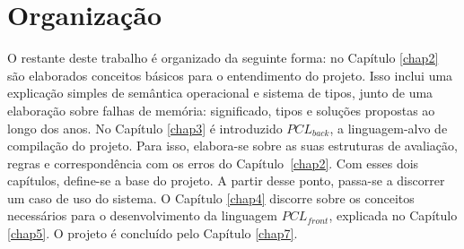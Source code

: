 \section{Organização}

O restante deste trabalho é organizado da seguinte forma: no Capítulo \ref{chap2} são elaborados conceitos básicos para o entendimento do projeto. Isso inclui uma explicação simples de semântica operacional e sistema de tipos, junto de uma elaboração sobre falhas de memória: significado, tipos e soluções propostas ao longo dos anos. No Capítulo \ref{chap3} é introduzido $PCL_{back}$, a linguagem-alvo de compilação do projeto. Para isso, elabora-se sobre as suas estruturas de avaliação, regras e correspondência com os erros do Capítulo~\ref{chap2}. Com esses dois capítulos, define-se a base do projeto. A partir desse ponto, passa-se a discorrer um caso de uso do sistema. O Capítulo \ref{chap4} discorre sobre os conceitos necessários para o desenvolvimento da linguagem $PCL_{front}$, explicada no Capítulo \ref{chap5}. O projeto é concluído pelo Capítulo \ref{chap7}.
